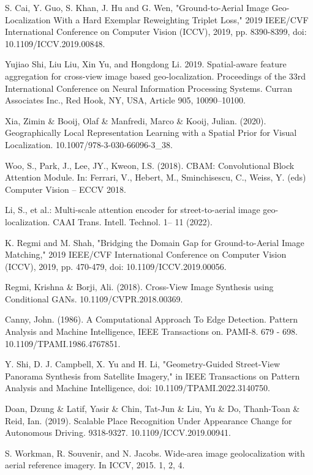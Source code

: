 \documentclass[10pt,letterpaper]{article}
\begin{document}
\begin{thebibliography}{10}
  S. Cai, Y. Guo, S. Khan, J. Hu and G. Wen, "Ground-to-Aerial Image Geo-Localization With a Hard Exemplar Reweighting Triplet Loss," 2019 IEEE/CVF International Conference on Computer Vision (ICCV), 2019, pp. 8390-8399, doi: 10.1109/ICCV.2019.00848.
  
  Yujiao Shi, Liu Liu, Xin Yu, and Hongdong Li. 2019. Spatial-aware feature aggregation for cross-view image based geo-localization. Proceedings of the 33rd International Conference on Neural Information Processing Systems. Curran Associates Inc., Red Hook, NY, USA, Article 905, 10090–10100.
  
  Xia, Zimin \& Booij, Olaf \& Manfredi, Marco \& Kooij, Julian. (2020). Geographically Local Representation Learning with a Spatial Prior for Visual Localization. 10.1007/978-3-030-66096-3\_38. 
  
  Woo, S., Park, J., Lee, JY., Kweon, I.S. (2018). CBAM: Convolutional Block Attention Module. In: Ferrari, V., Hebert, M., Sminchisescu, C., Weiss, Y. (eds) Computer Vision – ECCV 2018. 
  
  Li, S., et al.: Multi-scale attention encoder for street-to-aerial image geo-localization. CAAI Trans. Intell. Technol. 1– 11 (2022).
  
  K. Regmi and M. Shah, "Bridging the Domain Gap for Ground-to-Aerial Image Matching," 2019 IEEE/CVF International Conference on Computer Vision (ICCV), 2019, pp. 470-479, doi: 10.1109/ICCV.2019.00056.
  
  Regmi, Krishna \& Borji, Ali. (2018). Cross-View Image Synthesis using Conditional GANs. 10.1109/CVPR.2018.00369. 
  
  Canny, John. (1986). A Computational Approach To Edge Detection. Pattern Analysis and Machine Intelligence, IEEE Transactions on. PAMI-8. 679 - 698. 10.1109/TPAMI.1986.4767851. 
  
  Y. Shi, D. J. Campbell, X. Yu and H. Li, "Geometry-Guided Street-View Panorama Synthesis from Satellite Imagery," in IEEE Transactions on Pattern Analysis and Machine Intelligence, doi: 10.1109/TPAMI.2022.3140750.
  
  Doan, Dzung \& Latif, Yasir \& Chin, Tat-Jun \& Liu, Yu \& Do, Thanh-Toan \& Reid, Ian. (2019). Scalable Place Recognition Under Appearance Change for Autonomous Driving. 9318-9327. 10.1109/ICCV.2019.00941. 
  
  S. Workman, R. Souvenir, and N. Jacobs. Wide-area image geolocalization with aerial reference imagery. In ICCV, 2015. 1, 2, 4.
\end{thebibliography}
\end{document}
